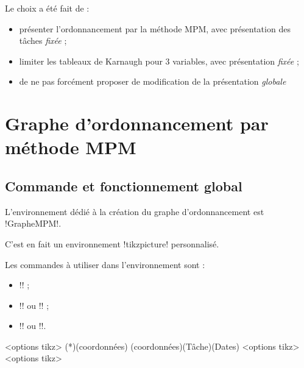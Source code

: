 \documentclass[french,a4paper,11pt]{article}
\begin{document}
\begin{noteblock}
Le choix a été fait de :

\begin{itemize}
	\item présenter l'ordonnancement par la méthode MPM, avec présentation des tâches \textit{fixée} ;
	\item limiter les tableaux de Karnaugh pour 3 variables, avec présentation \textit{fixée} ;
	\item de ne pas forcément proposer de modification de la présentation \textit{globale}
\end{itemize}
\vspace*{-\baselineskip}\leavevmode
\end{noteblock}

\pagebreak

\section{Graphe d'ordonnancement par méthode MPM}

\subsection{Commande et fonctionnement global}

\begin{cautionblock}
L'environnement dédié à la création du graphe d'ordonnancement est \motcletex!GrapheMPM!.

C'est en fait un environnement \motcletex!tikzpicture! personnalisé.

\smallskip

Les commandes à utiliser dans l'environnement sont :

\begin{itemize}
	\item \motcletex!\MPMPlaceNotice! ;
	\item \motcletex!\MPMPlaceTache! ou \motcletex!\MPMPlaceTaches! ;
	\item \motcletex!\MPMPlaceDuree! ou \motcletex!\MPMPlaceDurees!.
\end{itemize}
\vspace*{-\baselineskip}\leavevmode
\end{cautionblock}

\begin{DemoCode}
\begin{GrapheMPM}[clés]<options tikz>
	\MPMPlaceNotice(*)(coordonnées)
	\MPMPlaceTache(coordonnées)(Tâche)(Dates)
	<options tikz>
	<options tikz>
\end{GrapheMPM}
\end{DemoCode}
\end{document}
